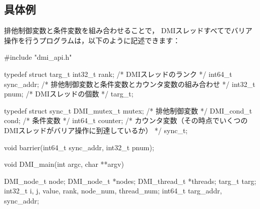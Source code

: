 \documentclass[report,12pt]{jsbook}
\begin{document}
\subsection{具体例}

排他制御変数と条件変数を組み合わせることで，
DMIスレッドすべてでバリア操作を行うプログラムは，以下のように記述できます：
\begin{code}
#include "dmi_api.h"

typedef struct targ_t
{
  int32_t rank;  /* DMIスレッドのランク */
  int64_t sync_addr;  /* 排他制御変数と条件変数とカウンタ変数の組み合わせ */
  int32_t pnum;  /* DMIスレッドの個数 */
}targ_t;

typedef struct sync_t
{
  DMI_mutex_t mutex;  /* 排他制御変数 */
  DMI_cond_t cond;  /* 条件変数 */
  int64_t counter;  /* カウンタ変数（その時点でいくつのDMIスレッドがバリア操作に到達しているか） */
}sync_t;

void barrier(int64_t sync_addr, int32_t pnum);

void DMI_main(int argc, char **argv)
{
  DMI_node_t node;
  DMI_node_t *nodes;
  DMI_thread_t *threads;
  targ_t targ;
  int32_t i, j, value, rank, node_num, thread_num;
  int64_t targ_addr, sync_addr;
  
}
\end{code}
\end{document}
